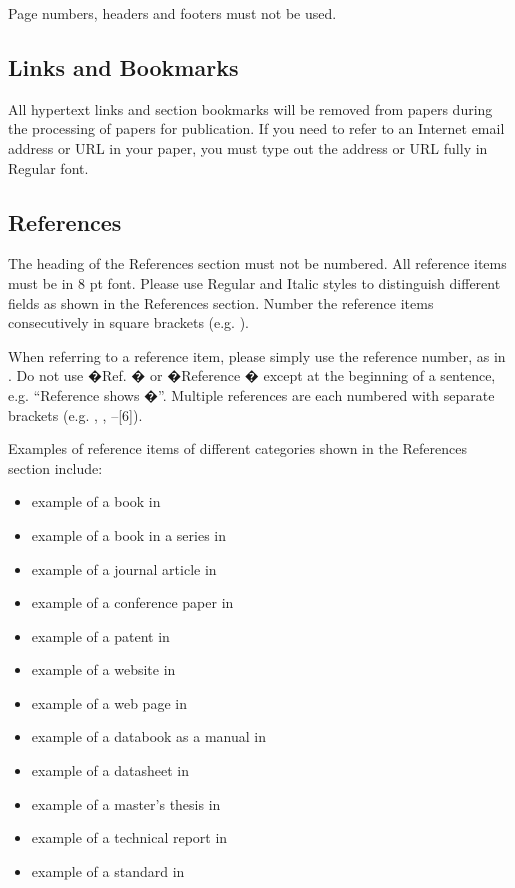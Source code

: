 \documentclass[10pt,conference,a4paper]{IEEEtran}
\begin{document}
Page numbers, headers and footers must not be used.

\subsection{Links and Bookmarks}

All hypertext links and section bookmarks will be removed from
papers during the processing of papers for publication.  If you
need to refer to an Internet email address or URL in your paper,
you must type out the address or URL fully in Regular font.

\subsection{References}

The heading of the References section must not be numbered.
All reference items must be in 8 pt font.  Please
use Regular and Italic styles to distinguish different fields as
shown in the References section. Number the reference items
consecutively in square brackets (e.g. \cite{IEEEexample:book}).

When referring to a reference item, please simply use the
reference number, as in \cite{IEEEexample:bookwithseriesvolume}.
Do not use �Ref. \cite{IEEEexample:article_typical}� or
�Reference \cite{IEEEexample:article_typical}� except at the
beginning of a sentence, e.g.  ``Reference
\cite{IEEEexample:article_typical} shows �''.  Multiple
references are each numbered with separate brackets (e.g.
\cite{IEEEexample:bookwithseriesvolume},
\cite{IEEEexample:article_typical},
\cite{IEEEexample:confwithpaper}--[6]).

Examples of reference items of different categories shown in the
References section include:

\begin{itemize}
\item	example of a book in \cite{IEEEexample:book}
\item	example of a book in a series in \cite{IEEEexample:bookwithseriesvolume}
\item	example of a journal article in \cite{IEEEexample:article_typical}
\item	example of a conference paper in \cite{IEEEexample:confwithpaper}
\item	example of a patent in \cite{IEEEexample:uspat}
\item	example of a website in \cite{IEEEexample:IEEEwebsite}
\item	example of a web page in \cite{IEEEexample:shellCTANpage}
\item	example of a databook as a manual in \cite{IEEEexample:motmanual}
\item	example of a datasheet in \cite{IEEEexample:datasheet}
\item	example of a master's thesis in \cite{IEEEexample:masterstype}
\item	example of a technical report in \cite{IEEEexample:techreptype}
\item	example of a standard in \cite{IEEEexample:standard}
\end{itemize}
\end{document}
